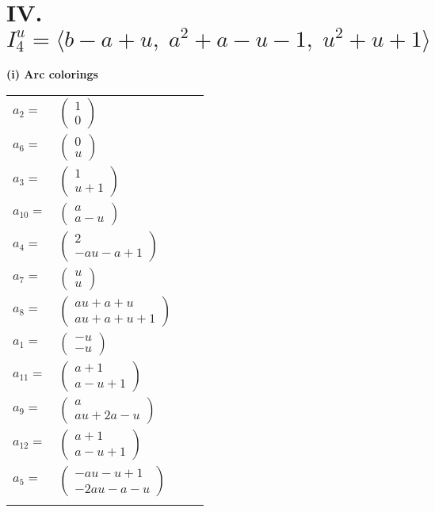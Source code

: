 \documentclass[1p]{elsarticle_modified}
\theoremstyle{definition}
\begin{document}
\centering \section*{IV. $I^u_{4}= \langle b- a+u,\;a^2+a- u-1,\;u^2+u+1 \rangle$}
\flushleft \textbf{(i) Arc colorings}\\
\begin{tabular}{m{7pt} m{180pt} m{7pt} m{180pt} }
\flushright $a_{2}=$&$\begin{pmatrix}1\\0\end{pmatrix}$ \\
\flushright $a_{6}=$&$\begin{pmatrix}0\\u\end{pmatrix}$ \\
\flushright $a_{3}=$&$\begin{pmatrix}1\\u+1\end{pmatrix}$ \\
\flushright $a_{10}=$&$\begin{pmatrix}a\\a- u\end{pmatrix}$ \\
\flushright $a_{4}=$&$\begin{pmatrix}2\\- a u- a+1\end{pmatrix}$ \\
\flushright $a_{7}=$&$\begin{pmatrix}u\\u\end{pmatrix}$ \\
\flushright $a_{8}=$&$\begin{pmatrix}a u+a+u\\a u+a+u+1\end{pmatrix}$ \\
\flushright $a_{1}=$&$\begin{pmatrix}- u\\- u\end{pmatrix}$ \\
\flushright $a_{11}=$&$\begin{pmatrix}a+1\\a- u+1\end{pmatrix}$ \\
\flushright $a_{9}=$&$\begin{pmatrix}a\\a u+2 a- u\end{pmatrix}$ \\
\flushright $a_{12}=$&$\begin{pmatrix}a+1\\a- u+1\end{pmatrix}$ \\
\flushright $a_{5}=$&$\begin{pmatrix}- a u- u+1\\-2 a u- a- u\end{pmatrix}$\\&\end{tabular}
\end{document}
